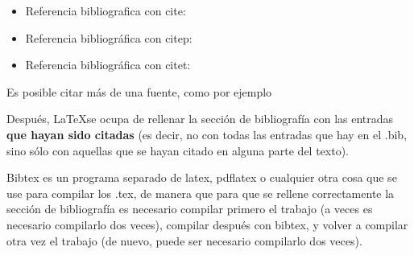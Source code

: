 \begin{itemize}
\item Referencia bibliografica con cite: \cite{ldesc2e}
\item Referencia bibliográfica con citep: \citep{notsoshort}
\item Referencia bibliográfica con citet: \citet{latexAPrimer}
\end{itemize}

Es posible citar más de una fuente, como por ejemplo \citep{latexCompanion,LaTeXLamport,texKnuth}

Después, \LaTeX se ocupa de rellenar la sección de bibliografía con las entradas \textbf{que hayan sido citadas} (es decir, no con todas las entradas que hay en el .bib, sino sólo con aquellas que se hayan citado en alguna parte del texto).

Bibtex es un programa separado de latex, pdflatex o cualquier otra cosa que se use para compilar los .tex, de manera que para que se rellene correctamente la sección de bibliografía es necesario compilar primero el trabajo (a veces es necesario compilarlo dos veces), compilar después con bibtex, y volver a compilar otra vez el trabajo (de nuevo, puede ser necesario compilarlo dos veces). 
